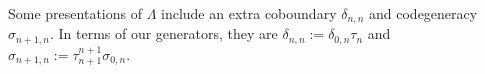 
Some presentations of $\Lambda$ include an extra 
coboundary $\delta_{n,n}$ and codegeneracy 
$\sigma_{n+1,n}$. 
In terms of our generators, they are 
$\delta_{n,n} := \delta_{0,n}\tau_n$ and 
$\sigma_{n+1,n} := \tau_{n+1}^{n+1} \sigma_{0,n}$.